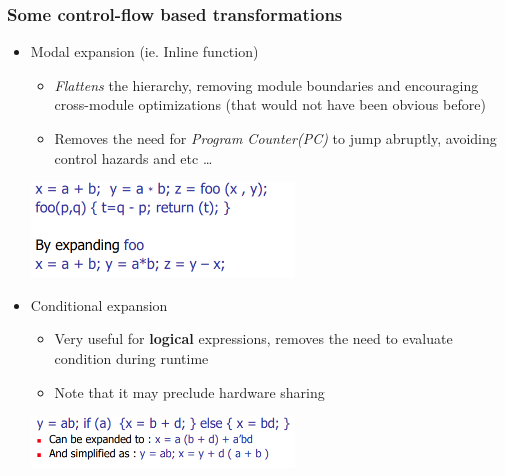 \documentclass{article}
\begin{document}
\subsubsection{Some control-flow based transformations}
\begin{itemize}
    \item Modal expansion (ie. Inline function)
        \begin{itemize}
            \item \textit{Flattens} the hierarchy, removing module boundaries and encouraging cross-module optimizations (that would not have been obvious before)
            \item Removes the need for \textit{Program Counter(PC)} to jump abruptly, avoiding control hazards and etc \dots
        \end{itemize}
        \begin{minipage}{\linewidth}
            \centering
            \includegraphics[width=7cm, scale=1]{S2/modalExpansion.PNG}
        \end{minipage}

    \item Conditional expansion
        \begin{itemize}
            \item Very useful for \textbf{logical} expressions, removes the need to evaluate condition during runtime
            \item Note that it may preclude hardware sharing
        \end{itemize}
        \begin{minipage}{\linewidth}
            \centering
            \includegraphics[width=7cm, scale=1]{S2/conditionalExpansion.PNG}
        \end{minipage}


\end{itemize}
\end{document}
